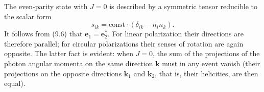 The even-parity state with $J=0$ is described by a symmetric tensor reducible to the scalar form
\[
s_{ik}=\mathrm{const}\cdot(\delta_{ik}-n_i n_k).
\]
It follows from (9.6) that $\mathbf{e}_1=\mathbf{e}_2^*$. For linear polarization their directions are therefore parallel; for circular polarizations their senses of rotation are again opposite. The latter fact is evident: when $J=0$, the sum of the projections of the photon angular momenta on the same direction $\mathbf{k}$ must in any event vanish (their projections on the opposite directions $\mathbf{k}_1$ and $\mathbf{k}_2$, that is, their helicities, are then equal).
